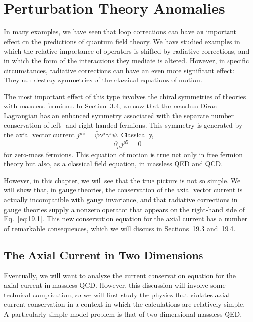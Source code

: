 \chapter{Perturbation Theory Anomalies}

In many examples, we have seen that loop corrections can have an important
effect on the predictions of quantum field theory.  We have studied examples
in which the relative importance of operators is shifted by radiative
corrections, and in which the form of the interactions they mediate is
altered.  However, in specific circumstances, radiative corrections can have an
even more significant effect: They can destroy symmetries of the classical
equations of motion.

The most important effect of this type involves the chiral symmetries of
theories with massless fermions.  In Section~3.4, we saw that the massless
Dirac Lagrangian has an enhanced symmetry associated with the separate number
conservation of left- and right-handed fermions.  This symmetry is generated
by the axial vector current $j^{\mu 5} = \bar{\psi}\gamma^\mu\gamma^5\psi$.
Classically,
\begin{equation}
  \partial_\mu j^{\mu 5} = 0
  \label{eq:19.1}
\end{equation}
for zero-mass fermions.  This equation of motion is true not only in free
fermion theory but also, as a classical field equation, in massless QED and
QCD.

However, in this chapter, we will see that the true picture is not so simple.
We will show that, in gauge theories, the conservation of the axial vector
current is actually incompatible with gauge invariance, and that radiative
corrections in gauge theories supply a nonzero operator that appears on the
right-hand side of Eq.~\eqref{eq:19.1}.  This new conservation equation for
the axial current has a number of remarkable consequences, which we will
discuss in Sections~19.3 and~19.4.

\section{The Axial Current in Two Dimensions}

Eventually, we will want to analyze the current conservation equation for the
axial current in massless QCD.  However, this discussion will involve some
technical complication, so we will first study the physics that violates axial
current conservation in a context in which the calculations are relatively
simple.  A particularly simple model problem is that of two-dimensional
massless QED.

